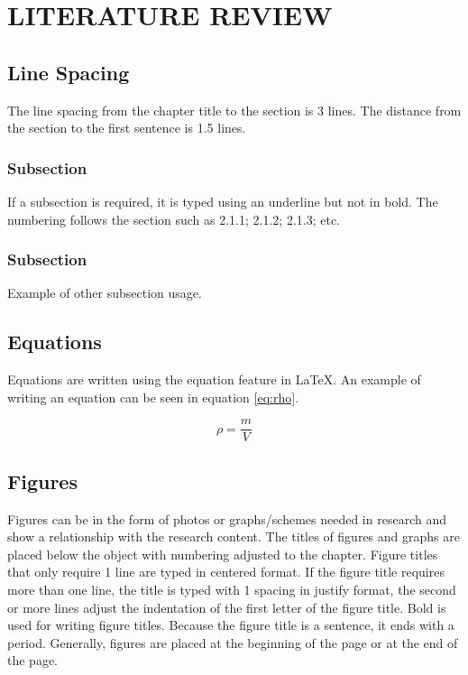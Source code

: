 \chapter{LITERATURE REVIEW}

\section{Line Spacing}
The line spacing from the chapter title to the section is 3 lines. The distance from the section to the first sentence is 1.5 lines.

\subsection{Subsection}
If a subsection is required, it is typed using an underline but not in bold. The numbering follows the section such as 2.1.1; 2.1.2; 2.1.3; etc.

\subsection{Subsection}
Example of other subsection usage.

\section{Equations}
Equations are written using the equation feature in LaTeX. An example of writing an equation can be seen in equation \ref{eq:rho}.

\begin{equation}
    \rho = \frac{m}{V}
    \label{eq:rho}
\end{equation}

\section{Figures}
Figures can be in the form of photos or graphs/schemes needed in research and show a relationship with the research content. The titles of figures and graphs are placed below the object with numbering adjusted to the chapter. Figure titles that only require 1 line are typed in centered format. If the figure title requires more than one line, the title is typed with 1 spacing in justify format, the second or more lines adjust the indentation of the first letter of the figure title. Bold is used for writing figure titles. Because the figure title is a sentence, it ends with a period. Generally, figures are placed at the beginning of the page or at the end of the page.


